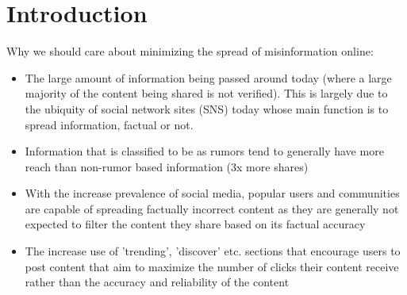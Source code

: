 \documentclass[a4paper,twoside,phd]{BYUPhys}
\begin{document}
 \frontmatter


 \makepreliminarypages


\doublespace
%

%

 \clearemptydoublepage
\singlespace
 \tableofcontents

\clearemptydoublepage
\listoffigures

\clearemptydoublepage
\listoftables

\clearemptydoublepage

\mainmatter
%
\chapter{Introduction}
\label{chap:Introduction}

Why we should care about minimizing the spread of misinformation online:
\begin{itemize}
	\item The large amount of information being passed around today (where a large majority of the content being shared is not verified). This is largely due to the ubiquity of social network sites (SNS) today whose main function is to spread information, factual or not.
	
	\item Information that is classified to be as rumors tend to generally have more reach than non-rumor based information (3x more shares)
	
	\item With the increase prevalence of social media, popular users and communities are capable of spreading factually incorrect content as they are generally not expected to filter the content they share based on its factual accuracy 
	
	\item The increase use of 'trending', 'discover' etc. sections that encourage users to post content that aim to maximize the number of clicks their content receive rather than the accuracy and reliability of the content
	
\end{itemize}
\end{document}
